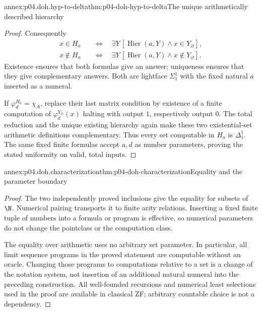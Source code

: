 \begin{annexitem}{annex:p04.doh.hyp-to-delta}{thm:p04-doh-hyp-to-delta}{The unique arithmetically described hierarchy}
\begin{proof}
Consequently
\[
\begin{aligned}
 x\in H_a&\quad\Longleftrightarrow\quad
   \exists Y\,[\operatorname{Hier}(a,Y)\land x\in Y_{\varnothing}],\\
 x\notin H_a&\quad\Longleftrightarrow\quad
   \exists Y\,[\operatorname{Hier}(a,Y)\land x\notin Y_{\varnothing}].
\end{aligned}
\]
Existence ensures that both formulas give an answer; uniqueness
ensures that they give complementary answers. Both are lightface
\(\Sigma^1_1\) with the fixed natural \(a\) inserted as a numeral.

If \(\varphi_d^{H_a}=\chi_A\), replace their last matrix condition
by existence of a finite computation of \(\varphi_d^{Y_{\varnothing}}(x)\)
halting with output \(1\), respectively output \(0\). The total
reduction and the unique existing hierarchy again make these two
existential-set arithmetic definitions complementary. Thus every
set computable in \(H_a\) is \(\Delta^1_1\). The same fixed
finite formulas accept \(a,d\) as number parameters, proving the
stated uniformity on valid, total inputs.
\end{proof}
\end{annexitem}

\begin{annexitem}{annex:p04.doh.characterization}{thm:p04-doh-characterization}{Equality and the parameter boundary}
\begin{proof}
The two independently proved inclusions give the equality for
subsets of \(\N\). Numerical pairing transports it to finite
arity relations. Inserting a fixed finite tuple of numbers into a
formula or program is effective, so numerical parameters do not
change the pointclass or the computation class.

The equality over arithmetic uses no arbitrary set parameter. In
particular, all limit sequence programs in the proved statement are
computable without an oracle. Changing those programs to computations
relative to a set is a change of the notation system, not insertion
of an additional natural numeral into the preceding construction.
All well-founded recursions and numerical least selections used in
the proof are available in classical ZF; arbitrary countable choice
is not a dependency.
\end{proof}
\end{annexitem}

